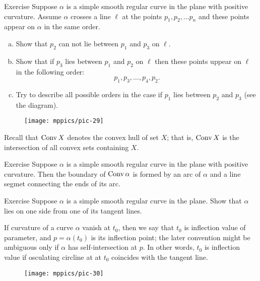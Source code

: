 \begin{thm}{Exercise}
Suppose $\alpha$ is a simple smooth regular curve in the plane with positive curvature.
Assume $\alpha$ crosses a line $\ell$ at the points $p_1,p_2,\dots p_n$ and these points appear on $\alpha$ in the same order.
\begin{enumerate}[(a)]

\item Show that $p_2$ can not lie between $p_1$ and $p_3$ on $\ell$.

\item Show that if $p_3$ lies between $p_1$ and $p_2$ on $\ell$ then these points uppear on $\ell$ in the following order:  
\[p_1,p_3,\dots,p_4 ,p_2.\]

\item Try to describe all possible orders in the case if $p_1$ lies between $p_2$ and $p_3$ (see the diagram).

\end{enumerate}
\end{thm}

\begin{figure}[h!]
\vskip-0mm
\centering
\texttt{[image: mppics/pic-29]}
\vskip0mm
\end{figure}

Recall that $\mathop{\rm Conv}\nolimits X$ denotes the convex hull of set $X$;
that is, $\mathop{\rm Conv}\nolimits X$ is the intersection of all convex sets containing $X$.

\begin{thm}{Exercise}\label{ex:convex-hull}
Suppose $\alpha$ is a simple smooth regular curve in the plane with positive curvature.
Then the boundary of $\mathop{\rm Conv}\nolimits \alpha$ is formed by an arc of $\alpha$ and a line segmet connecting the ends of its arc.
\end{thm}

\begin{thm}{Exercise}
Suppose $\alpha$ is a simple smooth regular curve in the plane.
Show that $\alpha$ lies on one side from one of its tangent lines. 
\end{thm}

If curvature of a curve $\alpha$ vanish at $t_0$, then we say that $t_0$ is inflection value of parameter, and $p=\alpha(t_0)$ is its inflection point;
the later convention might be ambiguous only if $\alpha$ has self-intersection at $p$. 
In other words, $t_0$ is inflection value if osculating circline at at $t_0$ coincides with the tangent line. 

\begin{figure}[h!]%
\centering
\texttt{[image: mppics/pic-30]}
\vskip0mm
\end{figure}

